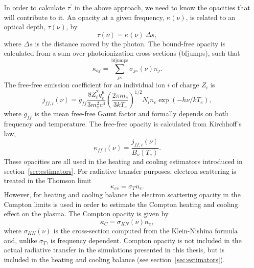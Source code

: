 In order to calculate $\tau^\prime$ in the above approach, we need
to know the opacities that will contribute to it. An opacity 
at a given frequency, $\kappa(\nu)$,
is related to an optical depth, $\tau(\nu)$, by
\begin{equation}
\tau(\nu) = \kappa(\nu)~\Delta s,
\end{equation}
where $\Delta s$ is the distance moved by the photon. The bound-free
opacity is calculated from a sum over photoionization cross-sections (bfjumps),
such that
\begin{equation}
\kappa_{bf} = \sum_{j\kappa}^{\mathrm{bfjumps}} \sigma_{j\kappa} (\nu) n_j.
\end{equation}
The free-free emission coefficient for an individual ion $i$ of charge $Z_i$ 
is \citep{gayet1970}
\begin{equation}
j_{ff,i} (\nu) = \bar{g}_{ff}\frac{8 Z_i^2 q_e^6}{3m_e^2 c^3}
\left( \frac{2\pi m_e}{3 k T_e} \right)^{1/2}
N_i n_e \exp(-h\nu/kT_e),
\label{eq:jff} 
\end{equation}
where $\bar{g}_{ff}$ is the mean free-free Gaunt factor and formally
depends on both frequency and temperature.
The free-free opacity is calculated from Kirchhoff's law, 
\begin{equation}
\kappa_{ff, i}(\nu) = \frac{j_{ff,i} (\nu)}{B_\nu (T_e)}.
\end{equation}
These opacities are all used in the heating and cooling estimators 
introduced in section~\ref{sec:estimators}.
For radiative transfer purposes, electron scattering is treated in the Thomson
limit 
\begin{equation}
\kappa_{es} = \sigma_T n_e.
\end{equation}
However, for heating and cooling balance the electron scattering opacity 
in the Compton limits is used in order to estimate the Compton heating and cooling 
effect on the plasma. The Compton opacity is given by
\begin{equation}
\kappa_{C} = \sigma_{KN} (\nu) n_e,
\end{equation}
where $\sigma_{KN} (\nu)$ is the cross-section computed 
from the Klein-Nishina formula \citep{klein-nishina} and, unlike $\sigma_T$,
is frequency dependent. Compton opacity is not included in the actual radiative transfer 
in the simulations presented in this thesis, but is included in the heating and 
cooling balance (see section~\ref{sec:estimators}).

